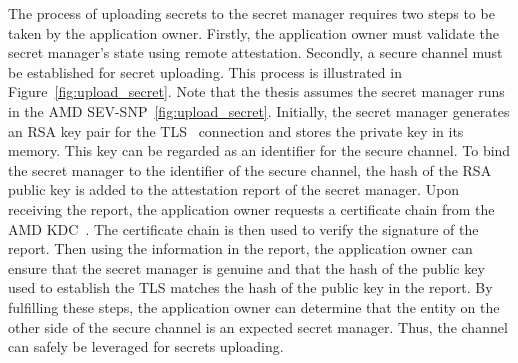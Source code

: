 The process of uploading secrets to the secret manager requires two steps to be taken by the application owner. Firstly, the application owner must validate the secret manager's state using remote attestation. Secondly, a secure channel must be established for secret uploading. This process is illustrated in Figure~\ref{fig:upload_secret}. 
Note that the thesis assumes the secret manager runs in the AMD SEV-SNP~\ref{fig:upload_secret}. Initially, the secret manager generates an RSA key pair for the TLS~\cite*{tls_record_size} connection and stores the private key in its memory. This key can be regarded as an identifier for the secure channel. To bind the secret manager to the identifier of the secure channel, the hash of the RSA public key is added to the attestation report of the secret manager. 
Upon receiving the report, the application owner requests a certificate chain from the AMD KDC~\cite*{snp_kdc}. The certificate chain is then used to verify the signature of the report. Then using the information in the report, the application owner can ensure that the secret manager is genuine and that the hash of the public key used to establish the TLS matches the hash of the public key 
in the report. By fulfilling these steps, the application owner can determine that the entity on the other side of the secure channel is an expected secret manager. Thus, the channel can safely be leveraged for secrets uploading.


